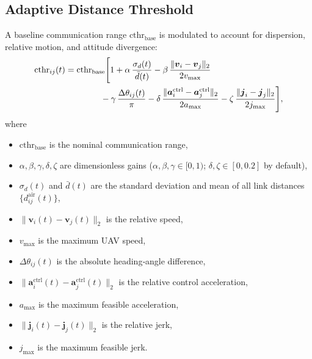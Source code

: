 \documentclass[preprint,12pt]{elsarticle}
\theoremstyle{definition}\newtheorem{definition}{Definition}
\theoremstyle{plain}\newtheorem{theorem}{Theorem}
\theoremstyle{plain}\newtheorem{lemma}{Lemma}
\theoremstyle{plain}\newtheorem{corollary}{Corollary}
\theoremstyle{plain}\newtheorem{assumption}{Assumption}
\theoremstyle{remark}\newtheorem{remark}[theorem]{Remark}
\begin{document}
\subsection{Adaptive Distance Threshold}
A baseline communication range $\mathrm{cthr}_{\text{base}}$ is modulated to
account for dispersion, relative motion, and attitude divergence:
\begin{equation}
\begin{aligned}
  \mathrm{cthr}_{ij}(t)
  ={}&\mathrm{cthr}_{\text{base}}\Biggl[
     1
     + \alpha\,\frac{\sigma_d(t)}{\bar d(t)}
     - \beta\,\frac{\|\boldsymbol v_i-\boldsymbol v_j\|_2}{2v_{\max}}\\
     &\hspace{2.8em}- \gamma\,\frac{\Delta\theta_{ij}(t)}{\pi}
     - \delta\,\frac{\|\boldsymbol a^{\text{ctrl}}_i-\boldsymbol a^{\text{ctrl}}_j\|_2}{2a_{\max}}
     - \zeta\,\frac{\|\boldsymbol j_i-\boldsymbol j_j\|_2}{2j_{\max}}
   \Biggr],
\end{aligned}
  \label{eq:cthradp}
\end{equation}
where
\begin{itemize}[nosep]
  \item $\mathrm{cthr}_{\text{base}}$ is the nominal communication range,
  \item $\alpha,\beta,\gamma,\delta,\zeta$ are dimensionless gains  
        (\(\alpha,\beta,\gamma\in[0,1)\); \(\delta,\zeta\in[0,0.2]\) by default),
  \item $\sigma_d(t)$ and $\bar d(t)$ are the standard deviation and mean of all link distances $\{d^{\text{air}}_{ij}(t)\}$,
  \item $\|\boldsymbol v_i(t)-\boldsymbol v_j(t)\|_2$ is the relative speed,
  \item $v_{\max}$ is the maximum UAV speed,
  \item $\Delta\theta_{ij}(t)$ is the absolute heading‐angle difference,
  \item $\|\boldsymbol a^{\text{ctrl}}_i(t)-\boldsymbol a^{\text{ctrl}}_j(t)\|_2$ is the relative control acceleration,
  \item $a_{\max}$ is the maximum feasible acceleration,
  \item $\|\boldsymbol j_i(t)-\boldsymbol j_j(t)\|_2$ is the relative jerk,
  \item $j_{\max}$ is the maximum feasible jerk.
\end{itemize}
\end{document}
